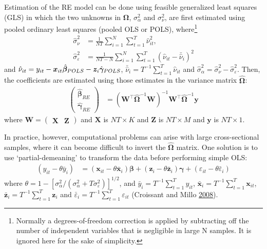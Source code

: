 \documentclass[
  12pt,
  a4paper]{article}
\begin{document}
Estimation of the RE model can be done using feasible generalized least
squares (GLS) in which the two unknowns in \(\bm{\Omega}\),
\(\sigma_{\alpha}^{2}\) and \(\sigma_{\nu}^{2}\), are first estimated
using pooled ordinary least squares (pooled OLS or POLS),
where\footnote{Normally a degrees-of-freedom correction is applied by
  subtracting off the number of independent variables that is negligible
  in large N samples. It is ignored here for the sake of simplicity.}
\begin{align}
\hat{\sigma}_{\nu}^{2} & = \frac{1}{NT}\sum_{i = 1}^{N}\sum_{t = 1}^{T}\hat{\nu}_{it}^{2}, \\
\hat{\sigma}_{\varepsilon}^{2} & = \frac{1}{NT - N}\sum_{i = 1}^{N}\sum_{t = 1}^{T}(\hat{\nu}_{it} - \bar{\hat{\nu}}_{i})^{2}
\end{align} and
\(\hat{\nu}_{it} = y_{it} - \bm{x}_{it}\hat{\bm{\beta}}_{\tiny{POLS}} - \bm{z}_{i}\hat{\bm{\gamma}}_{\tiny{POLS}}\),
\(\bar{\hat{\nu}}_{i} = T^{-1}\sum_{t = 1}^{T}\hat{\nu}_{it}\) and
\(\hat{\sigma}^{2}_{\alpha} = \hat{\sigma}^{2}_{\nu} - \hat{\sigma}^{2}_{\varepsilon}\).
Then, the coefficients are estimated using those estimates in the
variance matrix \(\hat{\bm{\Omega}}\): \begin{align}
\begin{pmatrix}
\hat{\bm{\beta}}_{RE} \\
\hat{\bm{\gamma}}_{RE}
\end{pmatrix} & = 
(\bm{W}^{\intercal}\hat{\bm{\Omega}}^{-1}\bm{W})^{-1}\bm{W}^{\intercal}\hat{\bm{\Omega}}^{-1}\bm{y}
\end{align} where
\(\bm{W} = \begin{pmatrix}\bm{X} & \bm{Z}\end{pmatrix}\) and \(\bm{X}\)
is \(NT \times K\) and \(\bm{Z}\) is \(NT \times M\) and \(\bm{y}\) is
\(NT \times 1\).

In practice, however, computational problems can arise with large
cross-sectional samples, where it can become difficult to invert the
\(\hat{\bm{\Omega}}\) matrix. One solution is to use `partial-demeaning'
to transform the data before performing simple OLS: \begin{align}
(y_{it} - \theta\bar{y}_{i}) & = (\bm{x}_{it} - \theta\bar{\bm{x}}_{i})\bm{\beta} + (\bm{z}_{i} - \theta \bar{\bm{z}}_{i})\bm{\gamma} + (\varepsilon_{it} - \theta \bar{\varepsilon}_{i}) \label{eq:partialdemean}
\end{align} where
\(\theta = 1 - [\sigma_{\alpha}^{2}/(\sigma_{\alpha}^{2} + T \sigma_{\varepsilon}^{2})]^{1/2}\),
and \(\bar{y}_{i} = T^{-1}\sum_{t = 1}^{T}y_{it}\),
\(\bar{\bm{x}}_{i} = T^{-1}\sum_{t = 1}^{T}\bm{x}_{it}\),
\(\bar{\bm{z}}_{i} = T^{-1}\sum_{t = 1}^{T}\bm{z}_{i}\) and
\(\bar{\varepsilon}_{i} = T^{-1}\sum_{t = 1}^{T}\varepsilon_{it}\)
(Croissant and Millo \protect\hyperlink{ref-R-plm_a}{2008}).
\end{document}

